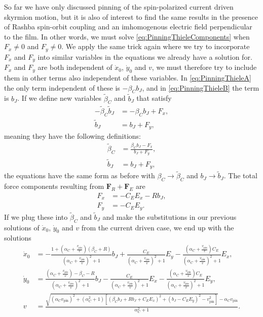 \documentclass[12pt, a4paper, twoside, openright]{report}
\numberwithin{equation}{chapter}
\numberwithin{figure}{chapter}
\numberwithin{table}{chapter}
\begin{document}
So far we have only discussed pinning of the spin-polarized current driven skyrmion motion, but it is also of interest to find the same results in the presence of Rashba spin-orbit coupling and an imhomogenous electric field perpendicular to the film. In other words, we must solve \eqref{eq:PinningThieleComponents} when $F_x \neq 0$ and $F_y \neq 0$. We apply the same trick again where we try to incorporate $F_x$ and $F_y$ into similar variables in the equations we already have a solution for. $F_x$ and $F_y$ are both independent of $\dot{x}_0$, $\dot{y}_0$ and $v$, we must therefore try to include them in other terms also independent of these variables. In \eqref{eq:PinningThieleA} the only term independent of these is $-\beta_Cb_J$, and in \eqref{eq:PinningThieleB} the term is $b_J$. If we define new variables $\tilde{\beta}_C$ and $\tilde{b}_J$ that satisfy
\begin{subequations}
\begin{align}
-\tilde{\beta}_C\tilde{b}_J &= -\beta_Cb_J + F_x, \\
\tilde{b}_J &= b_J + F_y,
\end{align}
\end{subequations}
meaning they have the following definitions:
\begin{subequations}
\begin{align}
\tilde{\beta}_C &= \frac{\beta_Cb_J-F_x}{b_J+F_y}, \\
\tilde{b}_J &= b_J + F_y,
\end{align}
\end{subequations}
the equations have the same form as before with $\beta_C \rightarrow \tilde{\beta}_C$ and $b_J \rightarrow \tilde{b}_J$. The total force components resulting from $\mathbold{F}_R+\mathbold{F}_E$ are
\begin{subequations}
\begin{align}
F_x &= -C_E E_x - Rb_J, \\
F_y &= -C_E E_y.
\end{align}
\end{subequations}
If we plug these into $\tilde{\beta}_C$ and $\tilde{b}_J$ and make the substitutions in our previous solutions of $\dot{x}_0$, $\dot{y}_0$ and $v$ from the current driven case, we end up with the solutions
\begin{subequations}
\begin{align}
\dot{x}_0 &= -\frac{1+(\alpha_C+\frac{v_{\textrm{pin}}}{v})(\beta_C+R)}{(\alpha_C+\frac{v_{\textrm{pin}}}{v})^2+1}b_J + \frac{C_E}{(\alpha_C+\frac{v_{\textrm{pin}}}{v})^2+1}E_y - \frac{(\alpha_C+\frac{v_{\textrm{pin}}}{v})C_E}{(\alpha_C+\frac{v_{\textrm{pin}}}{v})^2+1}E_x, \\
\dot{y}_0 &= \frac{(\alpha_C+\frac{v_{\textrm{pin}}}{v})-\beta_C - R}{(\alpha_C+\frac{v_{\textrm{pin}}}{v})^2+1}b_J - \frac{C_E}{(\alpha_C+\frac{v_{\textrm{pin}}}{v})^2+1}E_x - \frac{(\alpha_C+\frac{v_{\textrm{pin}}}{v}) C_E}{(\alpha_C+\frac{v_{\textrm{pin}}}{v})^2+1}E_y, \\
\label{eq:PinningVElectrical}
v &= \frac{\sqrt{(\alpha_Cv_{\textrm{pin}})^2+(\alpha_C^2+1)\left[(\beta_Cb_J+Rb_J+
C_EE_x)^2+(b_J-C_EE_y)^2-v_{\textrm{pin}}^2\right]}-\alpha_Cv_{\textrm{pin}}}{\alpha_C^2+1}.
\end{align}
\end{subequations}
\end{document}
